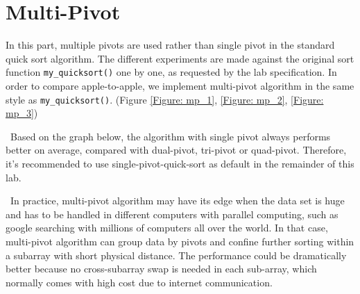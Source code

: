 \documentclass[12pt]{article}
\begin{document}
\section{Multi-Pivot}
In this part, multiple pivots are used rather than single pivot in the standard quick sort algorithm. The different experiments are made against the original sort function \verb|my_quicksort()| one by one, as requested by the lab specification. In order to compare apple-to-apple, we implement multi-pivot algorithm in the same style as \verb|my_quicksort()|.
(Figure \ref{Figure: mp_1}, \ref{Figure: mp_2}, \ref{Figure: mp_3})

~\newline\noindent Based on the graph below, the algorithm with single pivot always performs better on average, compared with dual-pivot, tri-pivot or quad-pivot. Therefore, it's recommended to use single-pivot-quick-sort as default in the remainder of this lab. 

~\newline\noindent In practice, multi-pivot algorithm may have its edge when the data set is huge and has to be handled in different computers with parallel computing, such as google searching with millions of computers all over the world. In that case, multi-pivot algorithm can group data by pivots and confine further sorting within a subarray with short physical distance. The performance could be dramatically better because no cross-subarray swap is needed in each sub-array, which normally comes with high cost due to internet communication.

\newpage
\end{document}
